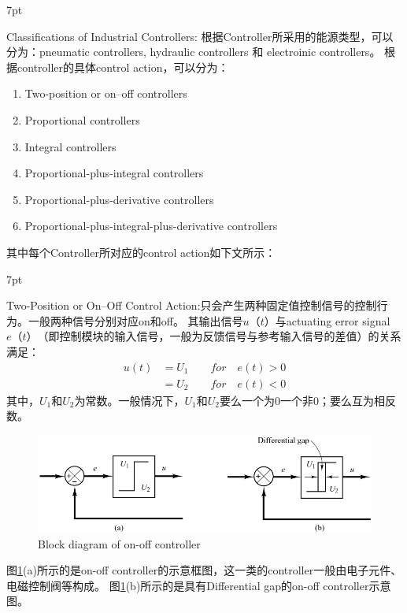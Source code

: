 \documentclass{article}
\numberwithin{equation}{section}
\numberwithin{figure}{section}
\newenvironment{formal}{%
\def\FrameCommand{%
\hspace{1pt}%
{\color{DarkBlue}\vrule width 2pt}%
{\color{formalshade}\vrule width 4pt}%
\colorbox{formalshade}%
}%
\MakeFramed{\advance\hsize-\width\FrameRestore}%
\noindent\hspace{-4.55pt}%
\begin{adjustwidth}{}{7pt}%
\vspace{2pt}\vspace{2pt}%
}
{%
\vspace{2pt}\end{adjustwidth}\endMakeFramed%
}
\begin{document}
\begin{formal}
    Classifications of Industrial Controllers:
    根据Controller所采用的能源类型，可以分为：pneumatic controllers, hydraulic controllers 和 electroinic controllers。
    根据controller的具体control action，可以分为：
    \begin{enumerate}
    \item Two-position or on–off controllers
    \item Proportional controllers
    \item Integral controllers
    \item Proportional-plus-integral controllers
    \item Proportional-plus-derivative controllers
    \item Proportional-plus-integral-plus-derivative controllers
    \end{enumerate}
\end{formal}
其中每个Controller所对应的control action如下文所示：
\begin{formal}
    Two-Position or On–Off Control Action:只会产生两种固定值控制信号的控制行为。一般两种信号分别对应on和off。
    其输出信号$u（t）$与actuating error signal$e（t）$（即控制模块的输入信号，一般为反馈信号与参考输入信号的差值）的关系满足：
    \begin{equation}
        \begin{split}
        u(t)&=U_1 \qquad  for \quad e(t)>0\\
            &=U_2 \qquad  for \quad e(t)<0    
        \end{split}
    \end{equation}
    其中，$U_1$和$U_2$为常数。一般情况下，$U_1$和$U_2$要么一个为0一个非0；要么互为相反数。
\end{formal}
\begin{figure}
    \centering
    \includegraphics[width=.8\textwidth]{Chapter2/twopositioncontroller.png} %
    \caption{Block diagram of on-off controller} %
    \label{twopositioncontroller} %
\end{figure}
图\ref{twopositioncontroller}(a)所示的是on-off controller的示意框图，这一类的controller一般由电子元件、电磁控制阀等构成。
图\ref{twopositioncontroller}(b)所示的是具有Differential gap的on-off controller示意图。
\end{document}
